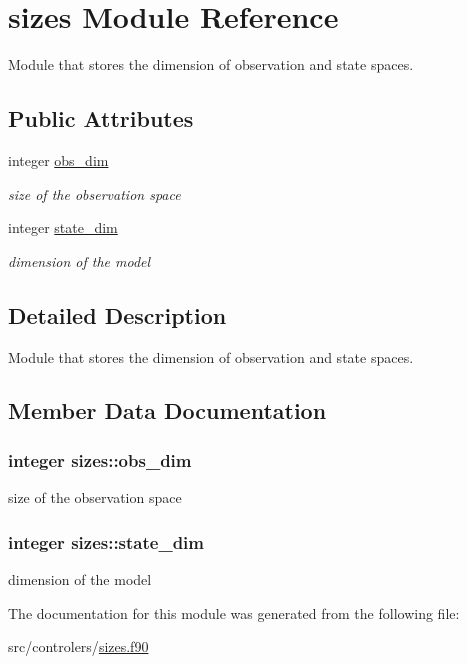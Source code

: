\hypertarget{classsizes}{\section{sizes Module Reference}
\label{classsizes}
}


Module that stores the dimension of observation and state spaces.  


\subsection*{Public Attributes}
\begin{DoxyCompactItemize}
\item 
integer \hyperlink{classsizes_a5f5dd89a39d1254b4ac7f7daf2280518}{obs\-\_\-dim}
\begin{DoxyCompactList}\small\item\em size of the observation space \end{DoxyCompactList}\item 
integer \hyperlink{classsizes_a53ccc50a0ecaf0a8601298c8c5d7ad63}{state\-\_\-dim}
\begin{DoxyCompactList}\small\item\em dimension of the model \end{DoxyCompactList}\end{DoxyCompactItemize}


\subsection{Detailed Description}
Module that stores the dimension of observation and state spaces. 

\subsection{Member Data Documentation}
\hypertarget{classsizes_a5f5dd89a39d1254b4ac7f7daf2280518}{
\subsubsection[{obs\-\_\-dim}]{\setlength{\rightskip}{0pt plus 5cm}integer sizes\-::obs\-\_\-dim}}\label{classsizes_a5f5dd89a39d1254b4ac7f7daf2280518}


size of the observation space 

\hypertarget{classsizes_a53ccc50a0ecaf0a8601298c8c5d7ad63}{
\subsubsection[{state\-\_\-dim}]{\setlength{\rightskip}{0pt plus 5cm}integer sizes\-::state\-\_\-dim}}\label{classsizes_a53ccc50a0ecaf0a8601298c8c5d7ad63}


dimension of the model 



The documentation for this module was generated from the following file\-:\begin{DoxyCompactItemize}
\item 
src/controlers/\hyperlink{sizes_8f90}{sizes.\-f90}\end{DoxyCompactItemize}
